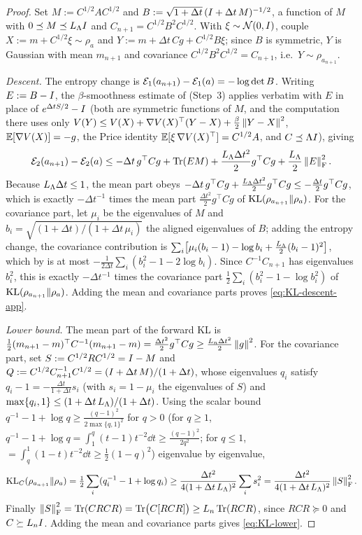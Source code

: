 \begin{proof}
Set $M:=C^{1/2}AC^{1/2}$ and $B:=\sqrt{1+\Delta t}\,(I+\Delta t\,M)^{-1/2}$, a function of $M$ with
$0\preceq M\preceq L_\Lambda I$ and $C_{n+1}=C^{1/2}B^2C^{1/2}$. With $\xi\sim\mathcal{N}(0,I)$, couple
$X:=m+C^{1/2}\xi\sim\rho_a$ and $Y:=m+\Delta t\,Cg+C^{1/2}B\xi$; since $B$ is symmetric, $Y$ is Gaussian
with mean $m_{n+1}$ and covariance $C^{1/2}B^2C^{1/2}=C_{n+1}$, i.e.\ $Y\sim\rho_{a_{n+1}}$.

\emph{Descent.} The entropy change is $\mathcal{E}_1(a_{n+1})-\mathcal{E}_1(a)=-\log\det B$. Writing $E:=B-I$,
the $\beta$-smoothness estimate of (Step~3) applies verbatim with $E$ in place of
$e^{\Delta t S/2}-I$ (both are symmetric functions of $M$, and the computation there uses only
$V(Y)\leq V(X)+\nabla V(X)^\top(Y-X)+\tfrac\beta2\left\lVert Y-X\right\rVert^2$, $\mathbb{E}[\nabla V(X)]=-g$, the Price identity
$\mathbb{E}[\xi\,\nabla V(X)^\top]=C^{1/2}A$, and $C\preceq\Lambda I$), giving
\[
    \mathcal{E}_2(a_{n+1})-\mathcal{E}_2(a)
    \leq-\Delta t\,g^\top Cg+\operatorname{Tr}(EM)+\frac{L_\Lambda\Delta t^2}2g^\top Cg+\frac{L_\Lambda}2\left\lVert E\right\rVert_{\mathrm{F}}^2 .
\]
Because $L_\Lambda\Delta t\leq1$, the mean part obeys
$-\Delta t\,g^\top Cg+\tfrac{L_\Lambda\Delta t^2}2g^\top Cg\leq-\tfrac{\Delta t}2g^\top Cg$, which is exactly
$-\Delta t^{-1}$ times the mean part $\tfrac{\Delta t^2}2g^\top Cg$ of $\mathrm{KL}(\rho_{a_{n+1}}\|\rho_a)$. For
the covariance part, let $\mu_i$ be the eigenvalues of $M$ and $b_i=\sqrt{(1+\Delta t)/(1+\Delta t\,\mu_i)}$
the aligned eigenvalues of $B$; adding the entropy change, the covariance contribution is
$\sum_i\bigl[\mu_i(b_i-1)-\log b_i+\tfrac{L_\Lambda}2(b_i-1)^2\bigr]$, which by  is at most
$-\tfrac1{2\Delta t}\sum_i(b_i^2-1-2\log b_i)$. Since $C^{-1}C_{n+1}$ has eigenvalues $b_i^2$, this is
exactly $-\Delta t^{-1}$ times the covariance part
$\tfrac12\sum_i(b_i^2-1-\log b_i^2)$ of $\mathrm{KL}(\rho_{a_{n+1}}\|\rho_a)$. Adding the mean and covariance
parts proves \eqref{eq:KL-descent-app}.

\emph{Lower bound.} The mean part of the forward KL is
$\tfrac12(m_{n+1}-m)^\top C^{-1}(m_{n+1}-m)=\tfrac{\Delta t^2}2g^\top Cg\geq\tfrac{L_n\Delta t^2}2\left\lVert g\right\rVert^2$.
For the covariance part, set $S:=C^{1/2}RC^{1/2}=I-M$ and
$Q:=C^{1/2}C_{n+1}^{-1}C^{1/2}=(I+\Delta t\,M)/(1+\Delta t)$, whose eigenvalues $q_i$ satisfy
$q_i-1=-\tfrac{\Delta t}{1+\Delta t}s_i$ (with $s_i=1-\mu_i$ the eigenvalues of $S$) and
$\max\{q_i,1\}\leq(1+\Delta t\,L_\Lambda)/(1+\Delta t)$. Using the scalar bound $q^{-1}-1+\log q\geq\tfrac{(q-1)^2}{2\max\{q,1\}^2}$
for $q>0$ (for $q\geq1$, $q^{-1}-1+\log q=\int_1^q(t-1)t^{-2}\dd t\geq\tfrac{(q-1)^2}{2q^2}$; for $q\leq1$,
$=\int_q^1(1-t)t^{-2}\dd t\geq\tfrac12(1-q)^2$) eigenvalue by eigenvalue,
\[
    \mathrm{KL}_C(\rho_{a_{n+1}}\|\rho_a)=\tfrac12\sum_i(q_i^{-1}-1+\log q_i)
    \geq\frac{\Delta t^2}{4(1+\Delta t\,L_\Lambda)^2}\sum_i s_i^2=\frac{\Delta t^2}{4(1+\Delta t\,L_\Lambda)^2}\left\lVert S\right\rVert_{\mathrm{F}}^2 .
\]
Finally $\left\lVert S\right\rVert_{\mathrm{F}}^2=\operatorname{Tr}(CRCR)=\operatorname{Tr}\bigl(C[RCR]\bigr)\geq L_n\operatorname{Tr}(RCR)$, since $RCR\succeq0$ and
$C\succeq L_nI$. Adding the mean and covariance parts gives \eqref{eq:KL-lower}.
\end{proof}

